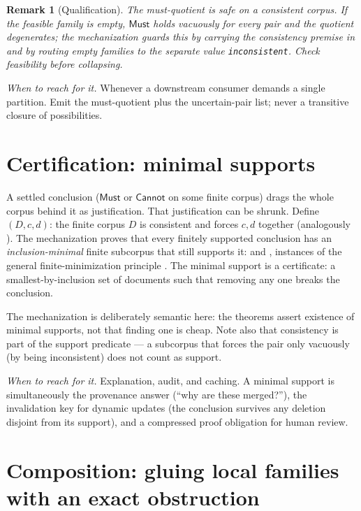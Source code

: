 \documentclass[11pt]{article}
\newtheorem{remark}{Remark}
\newcommand{\Must}{\mathsf{Must}}
\newcommand{\Cannot}{\mathsf{Cannot}}
\begin{document}
\begin{remark}[Qualification]
The must-quotient is safe \emph{on a consistent corpus}.  If the
feasible family is empty, $\Must$ holds vacuously for every pair and the
quotient degenerates; the mechanization guards this by carrying the
consistency premise in  and by routing
empty families to the separate  value
\texttt{inconsistent}.  Check feasibility before collapsing.
\end{remark}

\emph{When to reach for it.}  Whenever a downstream consumer demands a
single partition.  Emit the must-quotient plus the uncertain-pair list;
never a transitive closure of possibilities.

\section{Certification: minimal supports}
\label{sec:support}

A settled conclusion ($\Must$ or $\Cannot$ on some finite corpus) drags
the whole corpus behind it as justification.  That justification can be
shrunk.  Define ~$(D,c,d)$: the finite corpus $D$ is
consistent and forces $c,d$ together (analogously
).  The mechanization proves that every finitely
supported conclusion has an \emph{inclusion-minimal} finite subcorpus
that still supports it:  and
, instances of the general
finite-minimization principle .  The
minimal support is a certificate: a smallest-by-inclusion set of
documents such that removing any one breaks the conclusion.

The mechanization is deliberately semantic here: the theorems assert
existence of minimal supports, not that finding one is cheap.  Note also
that consistency is part of the support predicate --- a subcorpus that
forces the pair only vacuously (by being inconsistent) does not count as
support.

\emph{When to reach for it.}  Explanation, audit, and caching.  A
minimal support is simultaneously the provenance answer (``why are these
merged?''), the invalidation key for dynamic updates (the conclusion
survives any deletion disjoint from its support), and a compressed proof
obligation for human review.

\section{Composition: gluing local families with an exact obstruction}
\label{sec:gluing}
\end{document}
